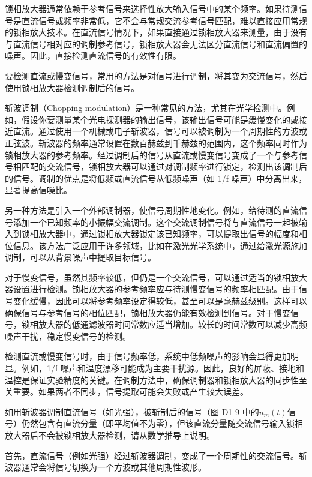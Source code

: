 \documentclass[dvipsnames, svgnames,a4paper,11pt]{article}
\begin{document}
锁相放大器通常依赖于参考信号来选择性放大输入信号中的某个频率。如果待测信号是直流信号或频率非常低，它不会与常规交流参考信号匹配，难以直接应用常规的锁相放大技术。在直流信号情况下，如果直接通过锁相放大器来测量，由于没有与直流信号相对应的调制参考信号，锁相放大器会无法区分直流信号和直流偏置的噪声。因此，直接检测直流信号的有效性有限。

要检测直流或慢变信号，常用的方法是对信号进行调制，将其变为交流信号，然后使用锁相放大器检测调制后的信号。

斩波调制（Chopping modulation）是一种常见的方法，尤其在光学检测中。例如，假设你要测量某个光电探测器的输出信号，该输出信号可能是缓慢变化的或接近直流。通过使用一个机械或电子斩波器，信号可以被调制为一个周期性的方波或正弦波。斩波器的频率通常设置在数百赫兹到千赫兹的范围内，这个频率同时作为锁相放大器的参考频率。经过调制后的信号从直流或慢变信号变成了一个与参考信号相匹配的交流信号，锁相放大器可以通过对调制频率进行锁定，检测出该调制后的信号。调制的优点是将低频或直流信号从低频噪声（如 1/f 噪声）中分离出来，显著提高信噪比。

另一种方法是引入一个外部调制器，使信号周期性地变化。例如，给待测的直流信号添加一个已知频率的小振幅交流调制。这个交流调制信号将与直流信号一起被输入到锁相放大器中，通过锁相放大器锁定该已知频率，可以提取出信号的幅度和相位信息。该方法广泛应用于许多领域，比如在激光光学系统中，通过给激光源施加调制，可以从背景噪声中提取目标信号。

对于慢变信号，虽然其频率较低，但仍是一个交流信号，可以通过适当的锁相放大器设置进行检测。锁相放大器的参考频率应与待测慢变信号的频率相匹配。由于信号变化缓慢，因此可以将参考频率设定得较低，甚至可以是毫赫兹级别。这样可以确保信号与参考信号的相位匹配，锁相放大器仍能有效检测到信号。对于慢变信号，锁相放大器的低通滤波器时间常数应适当增加。较长的时间常数可以减少高频噪声干扰，稳定慢变信号的检测。

检测直流或慢变信号时，由于信号频率低，系统中低频噪声的影响会显得更加明显。例如，1/f 噪声和温度漂移可能成为主要干扰源。因此，良好的屏蔽、接地和温控是保证实验精度的关键。在调制方法中，确保调制器和锁相放大器的同步性至关重要。如果两者不同步，信号提取可能会失败或产生较大误差。



\begin{question}
	如用斩波器调制直流信号（如光强），被斩制后的信号（图 D1-9 中的$u_m(t)$信号）仍然包含有直流分量（即平均值不为零），但该直流分量随交流信号输入锁相放大器后不会被锁相放大器检测，请从数学推导上说明。
\end{question}

首先，直流信号（例如光强）经过斩波器调制，变成了一个周期性的交流信号。斩波器通常会将信号切换为一个方波或其他周期性波形。
\end{document}
